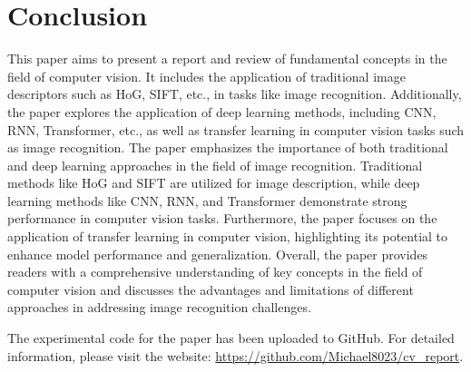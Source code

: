 \documentclass[10pt,twocolumn,letterpaper]{article}
\begin{document}
\section{Conclusion}

This paper aims to present a report and review of fundamental concepts in the field of computer vision. It includes the application of traditional image descriptors such as HoG, SIFT, etc., in tasks like image recognition. Additionally, the paper explores the application of deep learning methods, including CNN, RNN, Transformer, etc., as well as transfer learning in computer vision tasks such as image recognition. The paper emphasizes the importance of both traditional and deep learning approaches in the field of image recognition. Traditional methods like HoG and SIFT are utilized for image description, while deep learning methods like CNN, RNN, and Transformer demonstrate strong performance in computer vision tasks. Furthermore, the paper focuses on the application of transfer learning in computer vision, highlighting its potential to enhance model performance and generalization. Overall, the paper provides readers with a comprehensive understanding of key concepts in the field of computer vision and discusses the advantages and limitations of different approaches in addressing image recognition challenges.

The experimental code for the paper has been uploaded to GitHub. For detailed information, please visit the website:
\url{https://github.com/Michael8023/cv_report}.



{\small

% 

}
\end{document}
